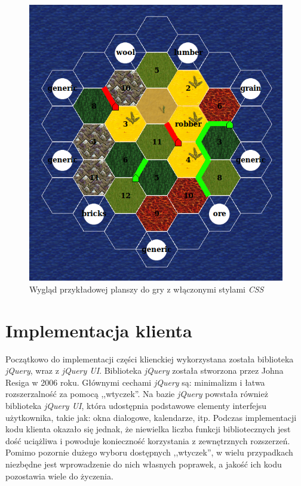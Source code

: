 \documentclass[11pt,twoside]{report}
\begin{document}
\begin{figure}[ht]
  \begin{center}
    \includegraphics[width=\linewidth]{board.png}
  \end{center}
  \caption{Wygląd przykładowej planszy do gry z włączonymi stylami
    \emph{CSS}}
  \label{fig:board}
\end{figure}

\cleardoublepage

\chapter{Implementacja klienta}

Początkowo do implementacji części klienckiej wykorzystana została
biblioteka \emph{jQuery}, wraz z \emph{jQuery UI}. Biblioteka
\emph{jQuery} została stworzona przez Johna Resiga w 2006
roku. Głównymi cechami \emph{jQuery} są: minimalizm i łatwa
rozszerzalność za pomocą ,,wtyczek''. Na bazie \emph{jQuery} powstała
również biblioteka \emph{jQuery UI}, która udostępnia podstawowe
elementy interfejsu użytkownika, takie jak: okna dialogowe,
kalendarze, itp. Podczas implementacji kodu klienta okazało się
jednak, że niewielka liczba funkcji bibliotecznych jest dość uciążliwa
i powoduje konieczność korzystania z zewnętrznych rozszerzeń. Pomimo
pozornie dużego wyboru dostępnych ,,wtyczek'', w wielu przypadkach
niezbędne jest wprowadzenie do nich własnych poprawek, a jakość ich
kodu pozostawia wiele do życzenia.
\end{document}
